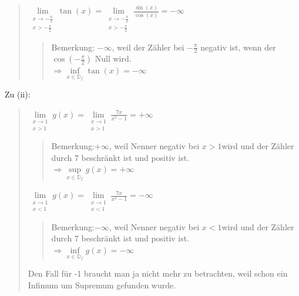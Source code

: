 \begin{quote}
\begin{quote}
	\end{quote}
	\textbullet \;\;$ \lim\limits_ {\substack{x \to -\frac{\pi}{2}  \\ x> -\frac{\pi}{2}}} \tan(x)=\lim\limits_ {\substack{x \to -\frac{\pi}{2}  \\ x> -\frac{\pi}{2}}}\frac{\sin(x)}{\cos(x)}=-\infty $\\
	\begin{quote}
		Bemerkung: $ -\infty $, weil der Zähler bei $ -\frac{\pi}{2}$ negativ ist, wenn der $ \cos(-\frac{\pi}{2}) $ Null wird.\\
		
		$\Rightarrow  \underset{x\in \mathbb{D}_f}{\inf}\tan(x) =-\infty $
		
	\end{quote}
	
\end{quote}
\pagebreak
Zu (ii):\\
\begin{quote}
	\textbullet\;\; $\lim\limits_ {\substack{x \to 1 \\ x>1}}g(x)=\lim\limits_ {\substack{x \to 1 \\ x>1}}\frac{7x}{x^2-1}=+\infty$\\
	\begin{quote}
		Bemerkung:$ +\infty $, weil Nenner negativ bei $ x>1 $wird und der Zähler durch 7 beschränkt ist  und positiv ist.\\
		$\Rightarrow  \underset{x\in \mathbb{D}_f}{\sup}g(x) =+\infty $
		
	\end{quote}
	\textbullet\;\; $\lim\limits_ {\substack{x \to 1 \\ x<1}}g(x)=\lim\limits_ {\substack{x \to 1 \\ x<1}}\frac{7x}{x^2-1}=-\infty$\\
	\begin{quote}
		Bemerkung:$ -\infty $, weil Nenner negativ bei $ x<1 $wird und der Zähler durch 7 beschränkt ist  und positiv ist.\\
		$\Rightarrow  \underset{x\in \mathbb{D}_f}{\inf}g(x) =-\infty $
		
	\end{quote}
	Den Fall für -1 braucht man ja nicht mehr zu betrachten, weil schon ein Infimum um Supremum gefunden wurde.\\
\end{quote}